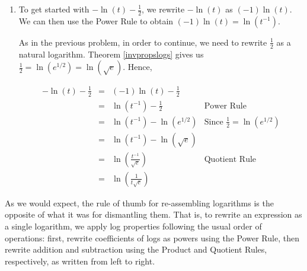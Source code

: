 \documentclass{ximera}
\begin{document}
\begin{example}
\begin{explanation}
\begin{enumerate}
In order to continue, we need to rewrite $3$ as a logarithm base $2$.  From Theorem \ref{invpropslogs}, we know $3 = \log_{2}\left(2^3\right)$.  Rewriting $3$ this way paves the way to use the Product Rule.

\[ \begin{array}{rclr}

4\log_{2}(x) + 3 & = & \log_{2}\left(x^4\right) + 3  & \text{Power Rule} \\ 
& = & \log_{2}\left(x^4\right) + \log_{2}\left(2^3\right)& \text{Since $3 = \log_{2}\left(2^3\right)$} \\
& = & \log_{2}\left(x^4\right) + \log_{2}(8)& \\
& = & \log_{2}\left( 8x^4\right) & \text{Product Rule} \\ \end{array}\]


\item To get started with $-\ln(t) - \frac{1}{2}$, we rewrite  $-\ln(t)$ as $(-1) \ln(t)$.  We can then use the Power Rule to obtain $(-1)\ln(t) = \ln\left(t^{-1}\right)$.

As in the previous problem, in order to continue, we need to rewrite $\frac{1}{2}$ as a natural logarithm. Theorem \ref{invpropslogs} gives us $\frac{1}{2} = \ln\left(e^{1/2}\right) = \ln\left(\sqrt{e}\right)$.  Hence,

\[ \begin{array}{rclr}

-\ln(t) - \frac{1}{2} & = & (-1)\ln(t) - \frac{1}{2}  &  \\ 
& = & \ln\left(t^{-1}\right) - \frac{1}{2} & \text{Power Rule} \\
& = & \ln\left(t^{-1}\right) - \ln\left(e^{1/2}\right)& \text{Since $\frac{1}{2} = \ln\left(e^{1/2}\right)$} \\
& = & \ln\left(t^{-1}\right) - \ln\left(\sqrt{e} \right)& \\   
& = & \ln\left(\frac{t^{-1}}{\sqrt{e}}\right) & \text{Quotient Rule} \\  
& = & \ln\left(\frac{1}{t\sqrt{e}}\right) &
\end{array}\]


\end{enumerate}

\end{explanation}
\end{example}

As we would expect, the rule of thumb for re-assembling logarithms is the opposite of what it was for dismantling them.  That is, to rewrite an expression as a single logarithm, we apply log properties following the usual order of operations:  first,  rewrite coefficients of logs as powers using the Power Rule, then rewrite addition and subtraction using the Product and Quotient Rules, respectively, as written from left to right.
\end{document}
